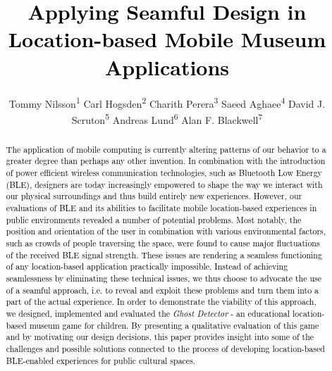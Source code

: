 \documentclass[prodmode,acmtomm]{acmsmall}
\begin{document}

\title{
\textcolor{black}{Applying Seamful Design in Location-based Mobile Museum Applications}
}
\author{Tommy Nilsson\textsuperscript{1}
Carl Hogsden\textsuperscript{2}
Charith Perera\textsuperscript{3}
Saeed Aghaee\textsuperscript{4}
David J. Scruton\textsuperscript{5}
Andreas Lund\textsuperscript{6}
Alan F. Blackwell\textsuperscript{7}
 \vspace{-15pt}}


\begin{abstract}



\textcolor{black}{The application of mobile computing is currently altering patterns of our behavior to a greater degree than perhaps any other invention. In combination with the introduction of power efficient wireless communication technologies, such as Bluetooth Low Energy (BLE), designers are today increasingly empowered to shape the way we interact with our physical surroundings and thus build entirely new experiences. 
However, our evaluations of BLE and its abilities to facilitate mobile location-based experiences in public environments revealed a number of potential problems. Most notably, the position and orientation of the user in combination with various environmental factors, such as crowds of people traversing the space, were found to cause major fluctuations of the received BLE signal strength. These issues are rendering a seamless functioning of any location-based application practically impossible. Instead of achieving seamlessness by eliminating these technical issues, we thus choose to advocate the use of a seamful approach, i.e. to reveal and exploit these problems and turn them into a part of the actual experience. In order to demonstrate the viability of this approach, we designed, implemented and evaluated the \textit{Ghost Detector} - an educational location-based museum game for children. By presenting a qualitative evaluation of this game and by motivating our design decisions, this paper provides insight into some of the challenges and possible solutions connected to the process of developing location-based BLE-enabled experiences for public cultural spaces.} 

\end{abstract}
\end{document}
